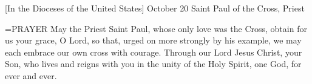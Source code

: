  [In the Dioceses of the United States]
October 20
Saint Paul of the Cross, Priest

\hangindent=\parindent \small{PRAYER 
May the Priest Saint Paul,
whose only love was the Cross,
obtain for us your grace, O Lord,
so that, urged on more strongly by his example,
we may each embrace our own cross with courage.
Through our Lord Jesus Christ, your Son,
who lives and reigns with you in the unity of the Holy Spirit,
one God, for ever and ever.\\}
 
